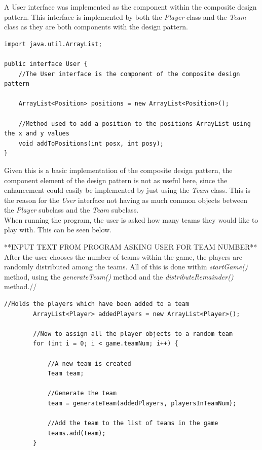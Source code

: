 \documentclass[a4paper,12pt]{extarticle}
\begin{document}
\noindent A User interface was implemented as the component within the composite design pattern. This interface is implemented by both the \textit{Player} class and the \textit{Team} class as they are both components with the design pattern.\\

\vspace{-1mm}
\begin{lstlisting}
import java.util.ArrayList;

public interface User {
    //The User interface is the component of the composite design pattern

    ArrayList<Position> positions = new ArrayList<Position>();

    //Method used to add a position to the positions ArrayList using the x and y values
    void addToPositions(int posx, int posy);
}
\end{lstlisting}
\vspace{-1mm}

\noindent Given this is a basic implementation of the composite design pattern, the component element of the design pattern is not as useful here, since the enhancement could easily be implemented by just using the \textit{Team} class. This is the reason for the \textit{User} interface not having as much common objects between the \textit{Player} subclass and the \textit{Team} subclass.\\

\noindent When running the program, the user is asked how many teams they would like to play with. This can be seen below.

**INPUT TEXT FROM PROGRAM ASKING USER FOR TEAM NUMBER**\\

\noindent After the user chooses the number of teams within the game, the players are randomly distributed among the teams. All of this is done within \textit{startGame()} method, using the \textit{generateTeam()} method and the \textit{distributeRemainder()} method.//

\begin{lstlisting}
//Holds the players which have been added to a team
        ArrayList<Player> addedPlayers = new ArrayList<Player>();

        //Now to assign all the player objects to a random team
        for (int i = 0; i < game.teamNum; i++) {

            //A new team is created
            Team team;

            //Generate the team
            team = generateTeam(addedPlayers, playersInTeamNum);

            //Add the team to the list of teams in the game
            teams.add(team);
        }
\end{lstlisting}
\vspace{-1mm}
\end{document}
